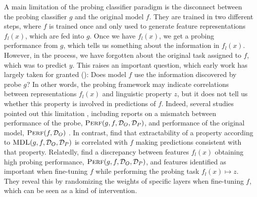 \documentclass[discussion]{clv3}
\begin{document}
A main limitation of the probing classifier paradigm is the disconnect between the probing classifier $g$ and the original model $f$. They are trained in two different steps, where $f$ is trained once and only used to generate feature representations $f_l(x)$, which are fed into $g$. Once we have $f_l(x)$, we get a probing performance from $g$, which tells us something about the information in  $f_l(x)$. However, in the process, we have forgotten about the original task assigned to $f$, which was to predict $y$. This raises an important question, which early work has largely taken for granted (): 
Does model $f$ use the information discovered by probe $g$? 
In other words, the probing framework may indicate correlations between representations $f_l(x)$ and linguistic property $z$, but it does not tell us whether this property is involved in predictions of $f$. 
Indeed, several studies pointed out this limitation \cite{belinkov-glass-2019-analysis}, including reports on a mismatch between performance of the probe, $\textsc{Perf}(g, f, \mathcal{D}_O, \mathcal{D}_P)$, and performance of the original model, $\textsc{Perf}(f, \mathcal{D}_O)$  \cite{VanmassenhoveDuWay2017}. 
In contrast, \citet{lovering2021predicting} find that extractability of a property according to $\textsc{MDL}(g, f, \mathcal{D}_O, \mathcal{D}_P)$ is correlated with $f$ making predictions consistent with that property. 
Relatedly, \citet{tamkin-etal-2020-investigating} find a discrepancy between features $f_l(x)$ obtaining high probing performance, $\textsc{Perf}(g, f, \mathcal{D}_O, \mathcal{D}_P)$, and features identified as important when fine-tuning $f$ while performing the probing task $f_l(x) \mapsto z$. They reveal this by randomizing the weights of specific layers when fine-tuning $f$, which can be seen as a kind of intervention.
\end{document}
